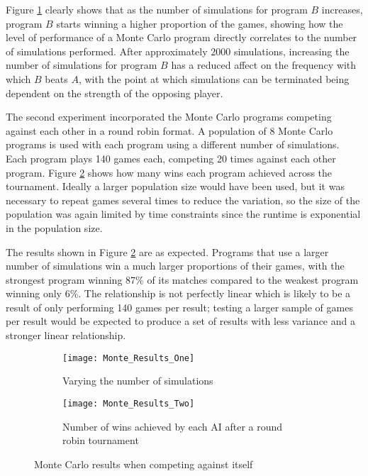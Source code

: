 \documentclass[12pt,a4paper]{article}
\begin{document}
Figure \ref{fig:monte_varying} clearly shows that as the number of simulations for program $B$ increases, program $B$ starts winning a higher proportion of the games, showing how the level of performance of a Monte Carlo program directly correlates to the number of simulations performed. After approximately 2000 simulations, increasing the number of simulations for program $B$ has a reduced affect on the frequency with which $B$ beats $A$, with the point at which simulations can be terminated being dependent on the strength of the opposing player.

The second experiment incorporated the Monte Carlo programs competing against each other in a round robin format. A population of 8 Monte Carlo programs is used with each program using a different number of simulations. Each program plays 140 games each, competing 20 times against each other program. Figure \ref{fig:monte_round_robin} shows how many wins each program achieved across the tournament. Ideally a larger population size would have been used, but it was necessary to repeat games several times to reduce the variation, so the size of the population was again limited by time constraints since the runtime is exponential in the population size.

The results shown in Figure \ref{fig:monte_round_robin} are as expected. Programs that use a larger number of simulations win a much larger proportions of their games, with the strongest program winning 87\% of its matches compared to the weakest program winning only 6\%. The relationship is not perfectly linear which is likely to be a result of only performing 140 games per result; testing a larger sample of games per result would be expected to produce a set of results with less variance and a stronger linear relationship.

\begin{figure}[ht]
\captionsetup{justification=centering}
\centering
\begin{subfigure}{.5\textwidth}
  \centering
  \texttt{[image: Monte\_Results\_One]}
  \caption{Varying the number of simulations}
  \label{fig:monte_varying}
\end{subfigure}%
\begin{subfigure}{.5\textwidth}
  \centering
  \texttt{[image: Monte\_Results\_Two]}
  \caption{Number of wins achieved by each AI after a round robin tournament}
  \label{fig:monte_round_robin}
\end{subfigure}
\caption{Monte Carlo results when competing against itself}
\label{fig:Monte_Carlo_Results}
\end{figure}
\end{document}
